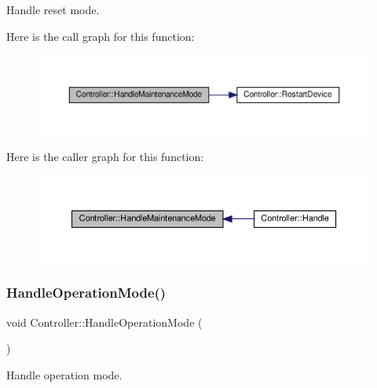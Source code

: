 Handle reset mode. 

Here is the call graph for this function\+:
\nopagebreak
\begin{figure}[H]
\begin{center}
\leavevmode
\includegraphics[width=350pt]{classController_a78080d5bfa37c5e783a630255846b721_cgraph}
\end{center}
\end{figure}
Here is the caller graph for this function\+:
\nopagebreak
\begin{figure}[H]
\begin{center}
\leavevmode
\includegraphics[width=350pt]{classController_a78080d5bfa37c5e783a630255846b721_icgraph}
\end{center}
\end{figure}
\mbox{\label{classController_a431dc67f69757e96cfc9b42454c71097}} 
\subsubsection{\texorpdfstring{Handle\+Operation\+Mode()}{HandleOperationMode()}}
{\footnotesize\ttfamily void Controller\+::\+Handle\+Operation\+Mode (\begin{DoxyParamCaption}{ }\end{DoxyParamCaption})\hspace{0.3cm}{\ttfamily [private]}}



Handle operation mode. 

